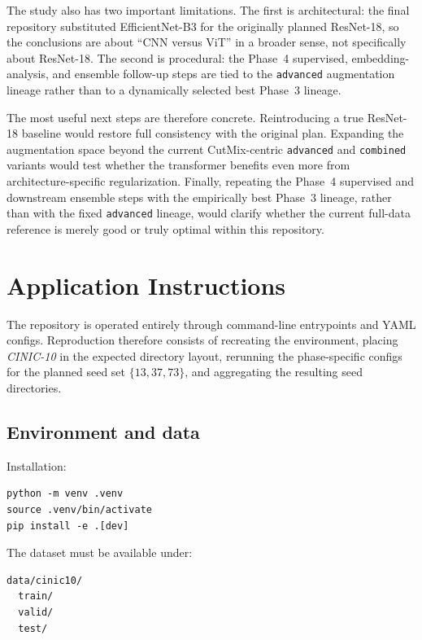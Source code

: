 \documentclass[12pt,a4paper]{article}
\begin{document}
The study also has two important limitations. The first is architectural: the final repository substituted EfficientNet-B3 for the originally planned ResNet-18, so the conclusions are about ``CNN versus ViT'' in a broader sense, not specifically about ResNet-18. The second is procedural: the Phase~4 supervised, embedding-analysis, and ensemble follow-up steps are tied to the \texttt{advanced} augmentation lineage rather than to a dynamically selected best Phase~3 lineage.

The most useful next steps are therefore concrete. Reintroducing a true ResNet-18 baseline would restore full consistency with the original plan. Expanding the augmentation space beyond the current CutMix-centric \texttt{advanced} and \texttt{combined} variants would test whether the transformer benefits even more from architecture-specific regularization. Finally, repeating the Phase~4 supervised and downstream ensemble steps with the empirically best Phase~3 lineage, rather than with the fixed \texttt{advanced} lineage, would clarify whether the current full-data reference is merely good or truly optimal within this repository.

\section{Application Instructions}
\label{sec:application}

The repository is operated entirely through command-line entrypoints and YAML configs. Reproduction therefore consists of recreating the environment, placing \emph{CINIC-10} in the expected directory layout, rerunning the phase-specific configs for the planned seed set $\{13, 37, 73\}$, and aggregating the resulting seed directories.

\subsection{Environment and data}
\label{subsec:environment}

Installation:

\begin{verbatim}
python -m venv .venv
source .venv/bin/activate
pip install -e .[dev]
\end{verbatim}

The dataset must be available under:

\begin{verbatim}
data/cinic10/
  train/
  valid/
  test/
\end{verbatim}
\end{document}
